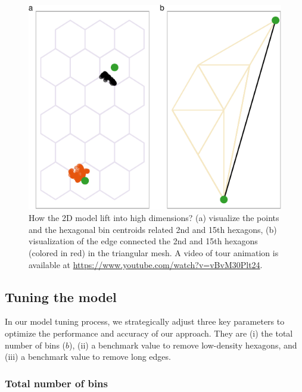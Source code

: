 \documentclass[
  12pt]{article}
\begin{document}
\begin{figure}

{\centering \includegraphics{paper_files/figure-pdf/fig-wkhighD-1.pdf}

}

\caption{\label{fig-wkhighD}How the 2D model lift into high dimensions?
(a) visualize the points and the hexagonal bin centroids related 2nd and
15th hexagons, (b) visualization of the edge connected the 2nd and 15th
hexagons (colored in red) in the triangular mesh. A video of tour
animation is available at
\url{https://www.youtube.com/watch?v=vBvM30Plt24}.}

\end{figure}

\hypertarget{tuning-the-model}{%
\subsection{Tuning the model}\label{tuning-the-model}}

In our model tuning process, we strategically adjust three key
parameters to optimize the performance and accuracy of our approach.
They are (i) the total number of bins (\(b\)), (ii) a benchmark value to
remove low-density hexagons, and (iii) a benchmark value to remove long
edges.

\hypertarget{total-number-of-bins}{%
\subsubsection{Total number of bins}\label{total-number-of-bins}}
\end{document}
